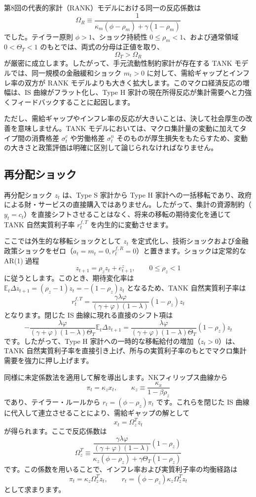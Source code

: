 \documentclass[
  japanese,
  lualatex,
  ja=standard,
  12pt,
  a4paper]{ltjsarticle}
\begin{document}
第8回の代表的家計（RANK）モデルにおける同一の反応係数は \[
\Omega_R \equiv \frac{1}{\kappa_m(\phi - \rho_m) + \gamma(1 - \rho_m)}
\] でした。テイラー原則 \(\phi>1\)、ショック持続性
\(0 \leq \rho_m < 1\)、および通常領域 \(0 < \Theta_T < 1\)
のもとでは、両式の分母は正値を取り、 \[
\Omega_T > \Omega_R
\] が厳密に成立します。したがって、手元流動性制約家計が存在する TANK
モデルでは、同一規模の金融緩和ショック \(m_t > 0\)
に対して、需給ギャップとインフレ率の双方が RANK
モデルよりも大きく拡大します。このマクロ経済反応の増幅は、IS
曲線がフラット化し、Type H
家計の現在所得反応が集計需要へと力強くフィードバックすることに起因します。

ただし、需給ギャップやインフレ率の反応が大きいことは、決して社会厚生の改善を意味しません。TANK
モデルにおいては、マクロ集計量の変動に加えてタイプ間の消費格差
\(\sigma_t^c\) や労働格差 \(\sigma_t^n\)
そのものが厚生損失をもたらすため、変動の大きさと政策評価は明確に区別して論じられなければなりません。


\subsection{再分配ショック}\label{ux518dux5206ux914dux30b7ux30e7ux30c3ux30af}

再分配ショック \(z_t\) は、Type S 家計から Type H
家計への一括移転であり、政府による財・サービスの直接購入ではありません。したがって、集計の資源制約（\(y_t = c_t\)）を直接シフトさせることはなく、将来の移転の期待変化を通じて
TANK 自然実質利子率 \(r_t^{f,T}\) を内生的に変動させます。

ここでは外生的な移転ショックとして \(z_t\)
を定式化し、技術ショックおよび金融政策ショックをゼロ（\(a_t = m_t = 0, r_t^{f,R} = 0\)）と置きます。ショックは定常的な
AR(1) 過程 \[
z_{t+1} = \rho_z z_t + e_{t+1}^z,
\qquad 0 \leq \rho_z < 1
\] に従うとします。このとき、期待変化率は
\(\mathbb{E}_t \Delta z_{t+1} = (\rho_z - 1) z_t = - (1 - \rho_z) z_t\)
となるため、TANK 自然実質利子率は \[
r_t^{f,T}
=
\frac{\gamma \lambda \varphi}{(\gamma+\varphi)(1-\lambda)} (1 - \rho_z) z_t
\] となります。閉じた IS 曲線に現れる直接のシフト項は \[
- \frac{\lambda \varphi}{(\gamma+\varphi)(1-\lambda)\Theta_T} \mathbb{E}_t \Delta z_{t+1}
=
\frac{\lambda \varphi}{(\gamma+\varphi)(1-\lambda)\Theta_T} (1 - \rho_z) z_t
\] です。したがって、Type H
家計への一時的な移転給付の増加（\(z_t > 0\)）は、TANK
自然実質利子率を直接引き上げ、所与の実質利子率のもとでマクロ集計需要を強力に押し上げます。

同様に未定係数法を適用して解を導出します。NKフィリップス曲線から \[
\pi_t = \kappa_z x_t,
\qquad
\kappa_z \equiv \frac{\kappa_x}{1 - \beta \rho_z}
\] であり、テイラー・ルールから \(r_t = (\phi - \rho_z) \pi_t\)
です。これらを閉じた IS
曲線に代入して連立させることにより、需給ギャップの解として \[
x_t = \Omega_z^T z_t
\] が得られます。ここで反応係数は \[
\Omega_z^T
\equiv
\frac{
\dfrac{\gamma \lambda \varphi}{(\gamma+\varphi)(1-\lambda)} (1 - \rho_z)
}{
\kappa_z (\phi - \rho_z) + \gamma \Theta_T (1 - \rho_z)
}
\] です。この係数を用いることで、インフレ率および実質利子率の均衡経路は
\[
\pi_t = \kappa_z \Omega_z^T z_t,
\qquad
r_t = (\phi - \rho_z) \kappa_z \Omega_z^T z_t
\] として求まります。
\end{document}
